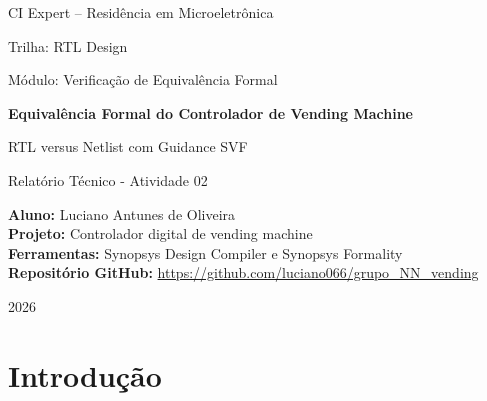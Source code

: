 \documentclass[11pt,a4paper]{article}
\begin{document}

\begin{titlepage}
    \centering

    {\large CI Expert -- Residência em Microeletrônica\par}
    {\large Trilha: RTL Design\par}
    {\large Módulo: Verificação de Equivalência Formal\par}

    \vspace{3cm}

    {\LARGE \textbf{Equivalência Formal do Controlador de Vending Machine}\par}

    \vspace{0.7cm}

    {\Large RTL versus Netlist com Guidance SVF\par}

    \vspace{1cm}

    {\large Relatório Técnico - Atividade 02\par}

    \vfill

    \begin{flushleft}
    \textbf{Aluno:} Luciano Antunes de Oliveira\\
    \textbf{Projeto:} Controlador digital de vending machine\\
    \textbf{Ferramentas:} Synopsys Design Compiler e Synopsys Formality\\
    \textbf{Repositório GitHub:} \url{https://github.com/luciano066/grupo_NN_vending}
    \end{flushleft}

    \vfill

    {\large 2026\par}
\end{titlepage}

\setcounter{page}{1}
\tableofcontents
\newpage
{}
\setcounter{page}{1}

\section{Introdução}
\end{document}
